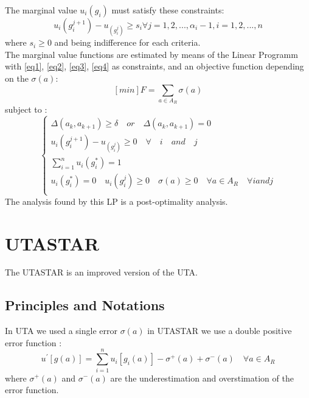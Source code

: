 \documentclass{report}
\begin{document}
The marginal value $u_i (g_i)$ must satisfy these constraints: 
\begin{equation}\label{eq4}
	u_i (g_i^{j+1}) - u_(g_i^{j}) \geq s_i \forall j = 1,2, ..., \alpha _i  - 1, i = 1,2, ..., n 
\end{equation}
where $s_i \geq 0$ and being indifference for each criteria.  \\

The marginal value functions are estimated by means of the Linear Programm with \eqref{eq1}, \eqref{eq2}, \eqref{eq3}, \eqref{eq4} as constraints, and an objective function depending on the $\sigma(a)$: 
$$ [min]F = \sum_{a \in A_R} \sigma(a)  $$
subject to : \\
\begin{equation}
      \begin{cases}
      	\Delta (a_k, a_{k+1} ) \geq \delta \quad or \quad \Delta (a_k, a_{k+1} ) = 0 \\
       	u_i (g_i^{j+1}) - u_(g_i^{j}) \geq 0 \quad \forall \quad i \quad and \quad j\\
       	\sum_{i=1}^{n} u_i(g_{i}^{*}) = 1\\
	u_i (g_i^{*}) = 0 \quad  u_i(g_i^{j}) \geq 0 \quad  \sigma(a) \geq 0 \quad  \forall a \in A_R\quad  \forall i and j\\
      \end{cases}
\end{equation}
The analysis found by this LP is a post-optimality analysis. 
\newpage
\section{UTASTAR}
The UTASTAR is an improved version of the UTA. 
\subsection{Principles and Notations}
In UTA we used a single error $\sigma(a)$ in UTASTAR we use a double positive error function : 
\begin{equation}
	u^{'} [g(a)] = \sum_{i=1}^{n} u_i [g_i (a)] - \sigma ^{+} (a)+ \sigma ^{-} (a) \quad  \forall a \in A_R
\end{equation}
where $\sigma ^{+} (a)$ and $\sigma ^{-} (a)$ are the underestimation and overstimation of the error function.\\ 
\end{document}
